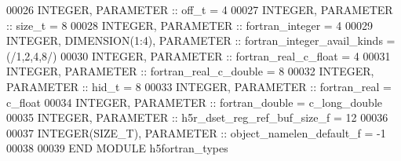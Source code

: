 \begin{DoxyCode}
00026         \textcolor{keywordtype}{INTEGER}, \textcolor{keywordtype}{PARAMETER} :: off\_t = 4
00027         \textcolor{keywordtype}{INTEGER}, \textcolor{keywordtype}{PARAMETER} :: size\_t = 8
00028         \textcolor{keywordtype}{INTEGER}, \textcolor{keywordtype}{PARAMETER} :: fortran\_integer = 4
00029         \textcolor{keywordtype}{INTEGER}, \textcolor{keywordtype}{DIMENSION(1:4)}, \textcolor{keywordtype}{PARAMETER} :: fortran\_integer\_avail\_kinds = (/1,2,4,8/)
00030         \textcolor{keywordtype}{INTEGER}, \textcolor{keywordtype}{PARAMETER} :: fortran\_real\_c\_float = 4
00031         \textcolor{keywordtype}{INTEGER}, \textcolor{keywordtype}{PARAMETER} :: fortran\_real\_c\_double = 8
00032         \textcolor{keywordtype}{INTEGER}, \textcolor{keywordtype}{PARAMETER} :: hid\_t = 8
00033         \textcolor{keywordtype}{INTEGER}, \textcolor{keywordtype}{PARAMETER} :: fortran\_real = c\_float
00034         \textcolor{keywordtype}{INTEGER}, \textcolor{keywordtype}{PARAMETER} :: fortran\_double = c\_long\_double
00035         \textcolor{keywordtype}{INTEGER}, \textcolor{keywordtype}{PARAMETER} :: h5r\_dset\_reg\_ref\_buf\_size\_f = 12
00036 
00037         \textcolor{keywordtype}{INTEGER(SIZE\_T)}, \textcolor{keywordtype}{PARAMETER} :: object\_namelen\_default\_f = -1
00038 
00039 \textcolor{keyword}{        END MODULE }h5fortran\_types
\end{DoxyCode}
